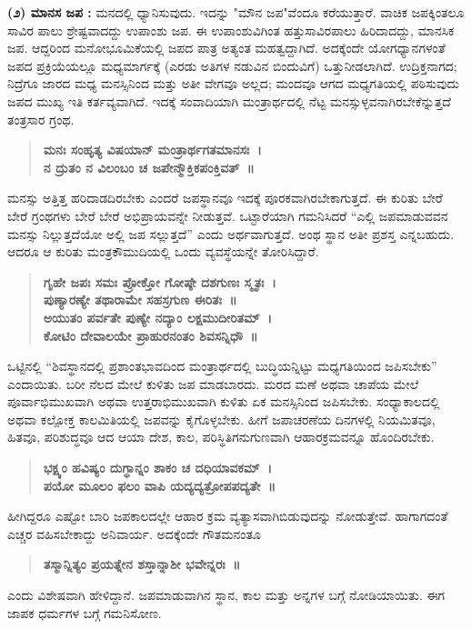 {\textbf{(೨) ಮಾನಸ ಜಪ :} ಮನದಲ್ಲಿ ಧ್ಯಾನಿಸುವುದು. ಇದನ್ನು "ಮೌನ ಜಪ"ವೆಂದೂ ಕರೆಯುತ್ತಾರೆ. ವಾಚಿಕ ಜಪಕ್ಕಿಂತಲೂ ಸಾವಿರ ಪಾಲು ಶ್ರೇಷ್ಟವಾದದ್ದು ಉಪಾಂಶು ಜಪ. ಈ ಉಪಾಂಶುವಿಗಿಂತ ಹತ್ತುಸಾವಿರಪಾಲು ಹಿರಿದಾದದ್ದು, ಮಾನಸಿಕ ಜಪ. ಆದ್ದರಿಂದ ಮನೋಭೂಮಿಕೆಯಲ್ಲಿ ಜಪದ ಪಾತ್ರ ಅತ್ಯಂತ ಮಹತ್ವದ್ದಾಗಿದೆ. ಅದಕ್ಕೆಂದೇ ಯೋಗಧ್ಯಾನಗಳಂತೆ ಜಪದ ಪ್ರಕ್ರಿಯೆಯಲ್ಲೂ ಮಧ್ಯಮಾರ್ಗಕ್ಕೆ (ಎರಡು ಅತಿಗಳ ನಡುವಿನ ಬಿಂದುವಿಗೆ) ಒತ್ತುನೀಡಲಾಗಿದೆ. ಉದ್ರಿಕ್ತನಾಗದ; ನಿದ್ರೆಗೂ ಜಾರದ ಮಧ್ಯ ಮನಸ್ಸಿನಿಂದ ಮತ್ತು ಅತೀ ವೇಗವೂ ಅಲ್ಲದ; ಮಂದವೂ ಆಗದ ಮಧ್ಯಗತಿಯಲ್ಲಿ ಪಠಿಸುವುದು ಜಪದ ಮುಖ್ಯ ಇತಿ ಕರ್ತವ್ಯವಾಗಿದೆ. ಇದಕ್ಕೆ ಸಂವಾದಿಯಾಗಿ ಮಂತ್ರಾರ್ಥದಲ್ಲಿ ನೆಟ್ಟ ಮನಸ್ಸುಳ್ಳವನಾಗಿರಬೇಕೆನ್ನುತ್ತದೆ ತಂತ್ರಸಾರ ಗ್ರಂಥ.
\begin{verse}
\textbf{ಮನಃ ಸಂಹೃತ್ಯ ವಿಷಯಾನ್ ಮಂತ್ರಾರ್ಥಗತಮಾನಸಃ~। \\
ನ ದ್ರುತಂ ನ ವಿಲಂಬಂ ಚ ಜಪೇನ್ಮೌಕ್ತಿಕಪಂಕ್ತಿವತ್~॥}
\end{verse}
ಮನಸ್ಸು ಅತ್ತಿತ್ತ ಹರಿದಾಡದಿರಬೇಕು ಎಂದರೆ ಜಪಸ್ಥಾನವೂ ಇದಕ್ಕೆ ಪೂರಕವಾಗಿರಬೇಕಾಗುತ್ತದೆ. ಈ ಕುರಿತು ಬೇರೆ ಬೇರೆ ಗ್ರಂಥಗಳು ಬೇರೆ ಬೇರೆ ಅಭಿಪ್ರಾಯವನ್ನೇ ನೀಡುತ್ತವೆ. ಒಟ್ಟಾರೆಯಾಗಿ ಗಮನಿಸಿದರೆ “ಎಲ್ಲಿ ಜಪಮಾಡುವವನ ಮನಸ್ಸು ನಿಲ್ಲುತ್ತದೆಯೋ ಅಲ್ಲಿ ಜಪ ಸಲ್ಲುತ್ತದೆ” ಎಂದು ಅರ್ಥವಾಗುತ್ತದೆ. ಅಂಥ ಸ್ಥಾನ ಅತೀ ಪ್ರಶಸ್ತ ಎನ್ನಬಹುದು. ಆದರೂ ಆ ಕುರಿತು ಮಂತ್ರಕೌಮುದಿಯಲ್ಲಿ ಒಂದು ವ್ಯವಸ್ಥೆಯನ್ನೇ ತೋರಿಸಿದ್ದಾರೆ.
\begin{verse}
\textbf{ಗೃಹೇ ಜಪಃ ಸಮಃ ಪ್ರೋಕ್ತೋ ಗೋಷ್ಠೇ ದಶಗುಣಃ ಸ್ಮೃತಃ~। \\
ಪುಣ್ಯಾರಣ್ಯೇ ತಥಾರಾಮೇ ಸಹಸ್ರಗುಣ ಈರಿತಃ~॥\\
ಅಯುತಂ ಪರ್ವತೇ ಪುಣ್ಯೇ ನದ್ಯಾಂ ಲಕ್ಷಮುದೀರಿತಮ್~। \\
ಕೋಟಿಂ ದೇವಾಲಯೇ ಪ್ರಾಹುರನಂತಂ ಶಿವಸನ್ನಿಧೌ~॥}
\end{verse}
ಒಟ್ಟಿನಲ್ಲಿ “ಶಿವಸ್ಥಾನದಲ್ಲಿ ಪ್ರಶಾಂತಭಾವದಿಂದ ಮಂತ್ರಾರ್ಥದಲ್ಲಿ ಬುದ್ಧಿಯನ್ನಿಟ್ಟು ಮಧ್ಯಗತಿಯಿಂದ ಜಪಿಸಬೇಕು” ಎಂದಾಯಿತು. ಬರೀ ನೆಲದ ಮೇಲೆ ಕುಳಿತು ಜಪ ಮಾಡಬಾರದು. ಮರದ ಮಣೆ ಅಥವಾ ಚಾಪೆಯ ಮೇಲೆ ಪೂರ್ವಾಭಿಮುಖವಾಗಿ ಅಥವಾ ಉತ್ತರಾಭಿಮುಖವಾಗಿ ಕುಳಿತು ಏಕ ಮನಸ್ಸಿನಿಂದ ಜಪಿಸಬೇಕು. ಸಂಧ್ಯಾಕಾಲದಲ್ಲಿ ಅಥವಾ ಕಲ್ಪೋಕ್ತ ಕಾಲಮಿತಿಯಲ್ಲಿ ಜಪವನ್ನು ಕೈಗೊಳ್ಳಬೇಕು. ಹೀಗೆ ಜಪಾಚರಣೆಯ ದಿನಗಳಲ್ಲಿ ನಿಯಮಿತವೂ, ಹಿತವೂ, ಪರಿಶುದ್ಧವೂ ಆದ ಆಯಾ ದೇಶ, ಕಾಲ, ಪರಿಸ್ಥಿತಿಗನುಗುಣವಾಗಿ ಆಹಾರಕ್ರಮವನ್ನೂ ಹೊಂದಿರಬೇಕು. 
\begin{verse}
\textbf{ಭಕ್ಷ್ಯಂ ಹವಿಷ್ಯಂ ದುಗ್ಧಾನ್ನಂ ಶಾಕಂ ಚ ದಧಿಯಾವಕಮ್~। \\
ಪಯೋ ಮೂಲಂ ಫಲಂ ವಾಪಿ ಯದ್ಯದ್ಯತ್ರೋಪಪದ್ಯತೇ~॥}
\end{verse}
ಹೀಗಿದ್ದರೂ ಎಷ್ಟೋ ಬಾರಿ ಜಪಕಾಲದಲ್ಲೇ ಆಹಾರ ಕ್ರಮ ವ್ಯತ್ಯಾಸವಾಗಿಬಿಡುವುದನ್ನು ನೋಡುತ್ತೇವೆ. ಹಾಗಾಗದಂತೆ ಎಚ್ಚರ ವಹಿಸಬೇಕಾದ್ದು ಅನಿವಾರ್ಯ. ಅದಕ್ಕೆಂದೇ ಗೌತಮನಂತೂ 
\begin{verse}
\textbf{ತಸ್ಮಾನ್ನಿತ್ಯಂ ಪ್ರಯತ್ನೇನ ಶಸ್ತಾನ್ನಾಶೀ ಭವೇನ್ನರಃ~॥ }
\end{verse}
ಎಂದು ವಿಶೇಷವಾಗಿ ಹೇಳಿದ್ದಾನೆ. ಜಪಮಾಡುವಾಗಿನ ಸ್ಥಾನ, ಕಾಲ ಮತ್ತು ಅನ್ನಗಳ ಬಗ್ಗೆ ನೋಡಿಯಾಯಿತು. ಈಗ ಜಾಪಕ ಧರ್ಮಗಳ ಬಗ್ಗೆ ಗಮನಿಸೋಣ. 
}
